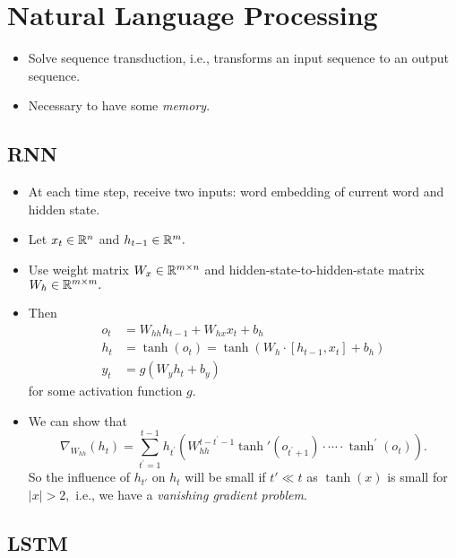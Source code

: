 \chapter{Natural Language Processing}

\begin{itemize}
\item 
Solve sequence transduction, i.e., transforms an input sequence to an output sequence.

\item 
Necessary to have some \textit{memory}.
\end{itemize}

\section{RNN}
\begin{itemize}
\item 
At each time step, receive two inputs: word embedding of current word and hidden state.

\item 
Let $x_t \in \mathbb{R}^{n}$ and $h_{t-1} \in \mathbb{R}^{m}.$

\item 
Use weight matrix $W_{x} \in \mathbb{R}^{m \times n}$ and hidden-state-to-hidden-state matrix $W_{h} \in \mathbb{R}^{m\times m}.$

\item 
Then 
\begin{align*}
	o_t &= W_{hh} h_{t-1} + W_{hx} x_t + b_h\\
	h_t &= \tanh(o_t) = \tanh(W_h \cdot [h_{t-1}, x_t] + b_h)\\
	y_t &= g(W_y h_t + b_y)
\end{align*}
for some activation function $g.$

\item 
We can show that 
\[ \nabla_{W_{hh}}(h_t) = \sum_{t^\prime = 1}^{t-1} h_{t^\prime} \left( W_{hh}^{t-t^\prime-1} \tanh'(o_{t^\prime+1}) \cdot \cdots \cdot  \tanh^\prime(o_{t}) \right). \]
So the influence of $h_{t'}$ on $h_{t}$ will be small if $t' \ll t$ as $\tanh(x)$ is small for $|x| > 2,$ i.e., we have a \textit{vanishing gradient problem}.

\end{itemize}

\section{LSTM}

